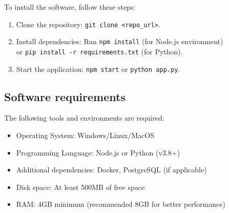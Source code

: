 \documentclass{article}
\begin{document}
To install the software, follow these steps:

\begin{enumerate}
    \item Clone the repository\@: \texttt{git clone <repo\_url>}.
    \item Install dependencies\@: Run \texttt{npm install} (for Node.js environment)\\
                                  or \texttt{pip install -r requirements.txt} (for Python).
    \item Start the application\@: \texttt{npm start} or \texttt{python app.py}.
\end{enumerate}

\subsection{Software requirements}

The following tools and environments are required:

\begin{itemize}
    \item Operating System\@: Windows/Linux/MacOS
    \item Programming Language\@: Node.js or Python (v3.8+)
    \item Additional dependencies\@: Docker, PostgreSQL (if applicable)
    \item Disk space\@: At least 500MB of free space
    \item RAM\@: 4GB minimum (recommended 8GB for better performance)
\end{itemize}
\end{document}
